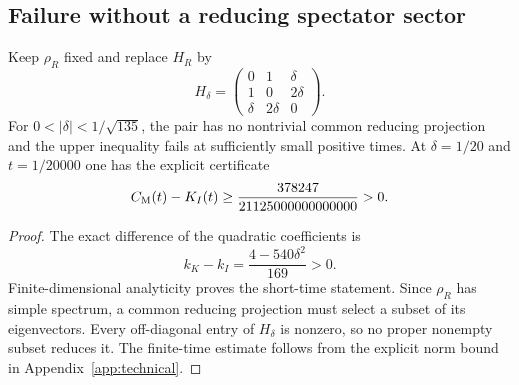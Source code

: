 \subsection{Failure without a reducing spectator sector}
\begin{proposition}\label{prop:robust}
Keep $\rho_R$ fixed and replace $H_R$ by
\begin{equation}\label{eq:perturbed-H}
 H_\delta=\begin{pmatrix}0&1&\delta\\1&0&2\delta\\\delta&2\delta&0\end{pmatrix}.
\end{equation}
For $0<|\delta|<1/\sqrt{135}$, the pair has no nontrivial common reducing
projection and the upper inequality fails at sufficiently small positive
times. At $\delta=1/20$ and $t=1/20000$ one has the explicit certificate
\begin{equation}\label{eq:robust-gap}
 C_{\mathrm M}(t)-K_I(t)\ge\frac{378247}{21125000000000000}>0.
\end{equation}
\end{proposition}
\begin{proof}
The exact difference of the quadratic coefficients is
\begin{equation}\label{eq:robust-curvature}
 k_K-k_I=\frac{4-540\delta^2}{169}>0.
\end{equation}
Finite-dimensional analyticity proves the short-time statement. Since
$\rho_R$ has simple spectrum, a common reducing projection must select a
subset of its eigenvectors. Every off-diagonal entry of $H_\delta$ is
nonzero, so no proper nonempty subset reduces it. The finite-time estimate
follows from the explicit norm bound in Appendix~\ref{app:technical}.
\end{proof}
